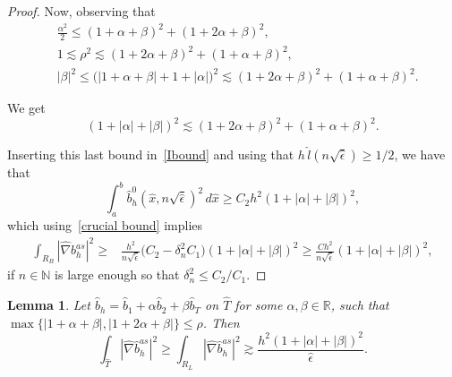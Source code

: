 \documentclass{article}
\newcommand{\yesdelete}[1]{}
\newtheorem{lemma}[thm]{Lemma}
\newcommand{\N}{\ensuremath{\mathbb{N}}\xspace}
\newcommand{\rz}{\mathbb{R}}
\newcommand{\oab}{\ensuremath{1+\alpha+\beta}}
\newcommand{\otab}{\ensuremath{1+2\alpha+\beta}}
\newcommand{\hatT}{\ensuremath{{\hat{T}}}}
\newcommand{\hatb}{\ensuremath{\hat{b}}}
\newcommand{\hatx}{\ensuremath{{\hat{x}}}}
\newcommand{\hatN}{\ensuremath{\hat{\nabla}}}
\newcommand{\hatnsep}{\ensuremath{n\sqrt{\hat{\epsilon}}}}
\begin{document}
\begin{appendix}
\begin{proof}
\yesdelete{
Now notice that,
\begin{equation*}
\frac{\alpha^2}2 \le (\oab)^2 +(\otab)^2,
\quad\text{ for all $\beta > 0$,}
\end{equation*}
due to the fact that, as a function of $\beta$,  $(\oab)^2+(\otab)^2$ attains its minimum at $\beta = -1-\frac{3\alpha}2$, and that minimum value is precisely $\alpha^2/2$. 
Also, 
\[
1 \lesssim \rho^2 \lesssim (1+2\alpha+\beta)^2
+(1+\alpha+\beta)^2 
\]
and 
\[
|\beta |^2 \le \big(|\oab|+1+|\alpha|\big)^2 \lesssim (1+2\alpha+\beta)^2
+(1+\alpha+\beta)^2 .
\]
}

Now, observing that
\begin{align*}
    &\frac{\alpha^2}2 \le (\oab)^2 +(\otab)^2,\\
&1 \lesssim \rho^2 \lesssim (1+2\alpha+\beta)^2
+(1+\alpha+\beta)^2,\\
&|\beta |^2 \le \big(|\oab|+1+|\alpha|\big)^2 \lesssim (1+2\alpha+\beta)^2
+(1+\alpha+\beta)^2. 
\end{align*}

We get
\[
(1+|\alpha|+|\beta|)^2
\lesssim (1+2\alpha+\beta)^2
+(1+\alpha+\beta)^2 
.
\]

Inserting this last bound in~\eqref{Ibound} and using that $h\, \hat l(\hatnsep)\ge 1/2$, we have that 
\[
\int_a^b \hatb_h^0(\hatx,\hatnsep)^2 \,d\hatx   \ge C_2h^2 (1+|\alpha|+|\beta|)^2,
\]
which using~\eqref{crucial bound} implies
\begin{align*}
    \int_{R_B}|\hatN b_h^{as}|^2 
    \ge{}& 
  \frac{h^2}{\hatnsep} \big( C_2 - \delta_n^2 C_1 \big)
  (1+|\alpha|+|\beta|)^2
\ge{} 
  \frac{Ch^2}{\hatnsep} 
  (1+|\alpha|+|\beta|)^2,
\end{align*}
if $n \in\N$ is large enough so that $\delta_n^2 \le C_2/C_1$.
\end{proof}



\begin{lemma}
\label{Lemma:bubble_bound_inf_2}
Let $\hatb_h= \hatb_1 + \alpha \hatb_2 + \beta \hatb_T$ on $\hatT$ for some $\alpha,\beta\in \rz$, such that 
$\max\{|\oab|,|\otab|\}\leq\rho$.
Then
\begin{equation*}
\int_\hatT|\hatN \hatb_h^{as}|^2 
\ge
\int_{R_L}|\hatN \hatb_h^{as}|^2 \gtrsim 
    \frac{ h^2(1+|\alpha|+|\beta|)^2}{\hat{\epsilon}}
    .
\end{equation*}  
\end{lemma}


\end{appendix}
\end{document}
